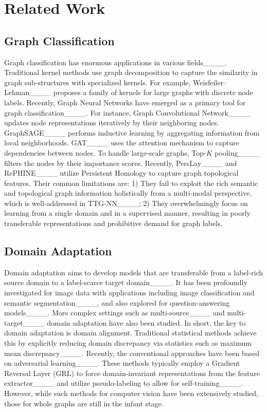 \section{Related Work}
\label{sec:rework}

\subsection{Graph Classification}
Graph classification has enormous applications in various fields____. Traditional kernel methods use graph decomposition to capture the similarity in graph sub-structures with specialized kernels. For example, Weisfeiler–Lehman____ proposes a family of kernels for large graphs with discrete node labels. Recently, Graph Neural Networks have emerged as a primary tool for graph classification____. For instance, Graph Convolutional Network____ updates node representations iteratively by their neighboring nodes. GraphSAGE____ performs inductive learning by aggregating information from local neighborhoods. GAT____ uses the attention mechanism to capture dependencies between nodes. To handle large-scale graphs, Top-$K$ pooling____ filters the nodes by their importance scores. Recently, PersLay____ and RePHINE____ utilize Persistent Homology to capture graph topological features. Their common limitations are: 1) They fail to exploit the rich semantic and topological graph information holistically from a multi-modal perspective, which is well-addressed in TTG-NN____; 2) They overwhelmingly focus on learning from a single domain and in a supervised manner, resulting in poorly transferable representations and prohibitive demand for graph labels. 

\subsection{Domain Adaptation}
Domain adaptation aims to develop models that are transferable from a label-rich source domain to a label-scarce target domain____. It has been profoundly investigated for image data with applications including image classification and semantic segmentation____, and also explored for question-answering models____. More complex settings such as multi-source____ and multi-target____ domain adaptation have also been studied. In short, the key to domain adaptation is domain alignment. Traditional statistical methods achieve this by explicitly reducing domain discrepancy via statistics such as maximum mean discrepancy____. Recently, the conventional approaches have been based on adversarial learning____. These methods typically employ a Gradient Reversal Layer (GRL) to force domain-invariant representations from the feature extractor____ and utilize pseudo-labeling to allow for self-training____. However, while such methods for computer vision have been extensively studied, those for whole graphs are still in the infant stage.


